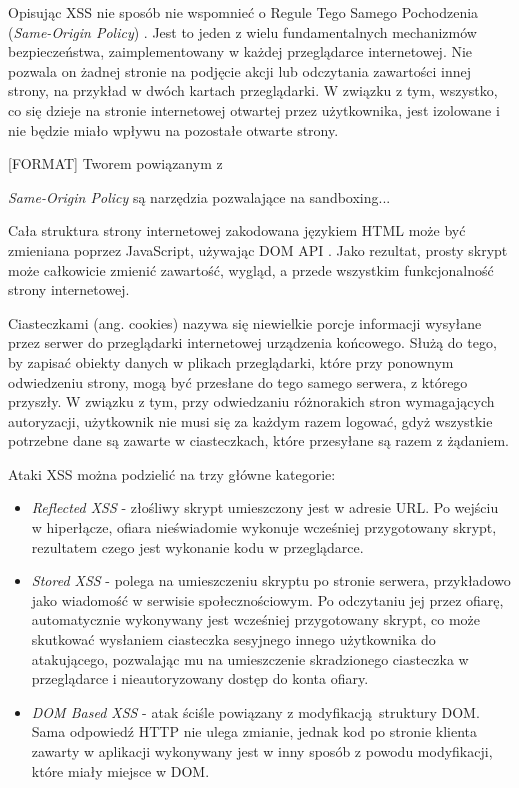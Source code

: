 \documentclass[12pt,twoside]{article}
\begin{document}
Opisując XSS nie sposób nie wspomnieć o Regule Tego Samego Pochodzenia (\emph{Same-Origin Policy}) \cite{SameOriginPolicy}. Jest to jeden z wielu fundamentalnych mechanizmów bezpieczeństwa, zaimplementowany w każdej przeglądarce internetowej. Nie pozwala on żadnej stronie na podjęcie akcji lub odczytania zawartości innej strony, na przykład w dwóch kartach przeglądarki. W związku z tym, wszystko, co się dzieje na stronie internetowej otwartej przez użytkownika, jest izolowane i nie będzie miało wpływu na pozostałe otwarte strony.

[FORMAT] Tworem powiązanym z {\emph{Same-Origin Policy} są narzędzia pozwalające na sandboxing...

Cała struktura strony internetowej zakodowana językiem HTML może być zmieniana poprzez JavaScript, używając DOM API \cite{DOM}. Jako rezultat, prosty skrypt może całkowicie zmienić zawartość, wygląd, a przede wszystkim funkcjonalność strony internetowej.

Ciasteczkami (ang. cookies) \cite{Cookies} nazywa się niewielkie porcje informacji wysyłane przez serwer do przeglądarki internetowej urządzenia końcowego. Służą do tego, by zapisać obiekty danych w plikach przeglądarki, które przy ponownym odwiedzeniu strony, mogą być przesłane do tego samego serwera, z którego przyszły. W związku z tym, przy odwiedzaniu różnorakich stron wymagających autoryzacji, użytkownik nie musi się za każdym razem logować, gdyż wszystkie potrzebne dane są zawarte w ciasteczkach, które przesyłane są razem z żądaniem. 

Ataki XSS można podzielić na trzy główne kategorie:

\begin{itemize}
	\item \emph{Reflected XSS} - złośliwy skrypt umieszczony jest w adresie URL. Po wejściu w hiperłącze, ofiara nieświadomie wykonuje wcześniej przygotowany skrypt, rezultatem czego jest wykonanie kodu w przeglądarce.
	\item \emph{Stored XSS} - polega na umieszczeniu skryptu po stronie serwera, przykładowo jako wiadomość w serwisie społecznościowym. Po odczytaniu jej przez ofiarę, automatycznie wykonywany jest wcześniej przygotowany skrypt, co może skutkować wysłaniem ciasteczka sesyjnego innego użytkownika do atakującego, pozwalając mu na umieszczenie skradzionego ciasteczka w przeglądarce i nieautoryzowany dostęp do konta ofiary.
	\item \emph{DOM Based XSS} - atak ściśle powiązany z modyfikacją struktury DOM. Sama odpowiedź HTTP nie ulega zmianie, jednak kod po stronie klienta zawarty w aplikacji wykonywany jest w inny sposób z powodu modyfikacji, które miały miejsce w DOM.
\end{itemize}

}
\end{document}
